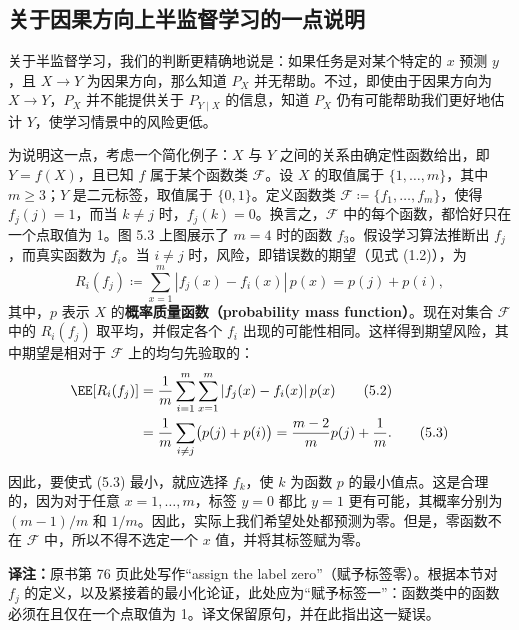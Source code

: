 \subsection{关于因果方向上半监督学习的一点说明}
\label{sec:ch05-ssl-causal-remark}

关于半监督学习，我们的判断更精确地说是：如果任务是对某个特定的 $x$ 预测 $y$，且 $X\to Y$ 为因果方向，那么知道 $P_X$ 并无帮助。不过，即使由于因果方向为 $X\to Y$，$P_X$ 并不能提供关于 $P_{Y\mid X}$ 的信息，知道 $P_X$ 仍有可能帮助我们更好地估计 $Y$，使学习情景中的风险更低。

为说明这一点，考虑一个简化例子：$X$ 与 $Y$ 之间的关系由确定性函数给出，即 $Y=f(X)$，且已知 $f$ 属于某个函数类 $\mathcal{F}$。设 $X$ 的取值属于 $\{1,\ldots,m\}$，其中 $m\geq3$；$Y$ 是二元标签，取值属于 $\{0,1\}$。定义函数类 $\mathcal{F}\coloneqq\{f_1,\ldots,f_m\}$，使得 $f_j(j)=1$，而当 $k\neq j$ 时，$f_j(k)=0$。换言之，$\mathcal{F}$ 中的每个函数，都恰好只在一个点取值为 1。图 5.3 上图展示了 $m=4$ 时的函数 $f_3$。假设学习算法推断出 $f_j$，而真实函数为 $f_i$。当 $i\neq j$ 时，风险，即错误数的期望（见式 (1.2)），为
\begin{equation}
 R_i(f_j)\coloneqq\sum_{x=1}^m|f_j(x)-f_i(x)|\,p(x)
 =p(j)+p(i),
 \tag{5.1}
\end{equation}
其中，$p$ 表示 $X$ 的\textbf{概率质量函数（probability mass function）}。现在对集合 $\mathcal{F}$ 中的 $R_i(f_j)$ 取平均，并假定各个 $f_i$ 出现的可能性相同。这样得到期望风险，其中期望是相对于 $\mathcal{F}$ 上的均匀先验取的：
\begin{align}
 \EE[R_i(f_j)]&=\frac1m\sum_{i=1}^m\sum_{x=1}^m
 |f_j(x)-f_i(x)|\,p(x)
 \tag{5.2}\\
 &=\frac1m\sum_{i\neq j}\bigl(p(j)+p(i)\bigr)
 =\frac{m-2}{m}p(j)+\frac1m.
 \tag{5.3}
\end{align}



因此，要使式 (5.3) 最小，就应选择 $f_k$，使 $k$ 为函数 $p$ 的最小值点。这是合理的，因为对于任意 $x=1,\ldots,m$，标签 $y=0$ 都比 $y=1$ 更有可能，其概率分别为 $(m-1)/m$ 和 $1/m$。因此，实际上我们希望处处都预测为零。但是，零函数不在 $\mathcal{F}$ 中，所以不得不选定一个 $x$ 值，并将其标签赋为零。

\par\smallskip
{\small\noindent\textbf{译注：}原书第 76 页此处写作“assign the label zero”（赋予标签零）。根据本节对 $f_j$ 的定义，以及紧接着的最小化论证，此处应为“赋予标签一”：函数类中的函数必须在且仅在一个点取值为 1。译文保留原句，并在此指出这一疑误。}
\par\smallskip


